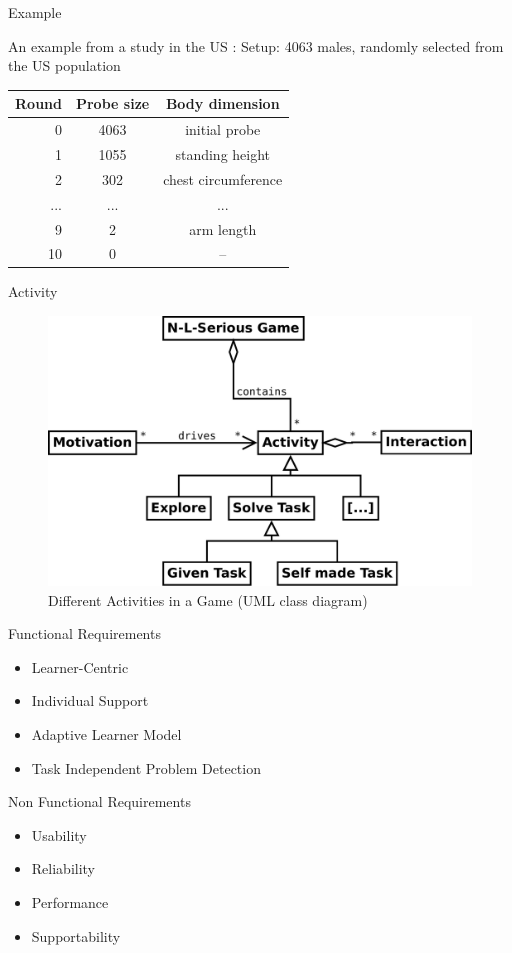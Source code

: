 \documentclass[compress]{beamer}
\begin{document}
\begin{frame}{Example}
\begin{block}{An example from a study in the US \cite{Bailey1982}:}
Setup: 4063 males, randomly selected from the US population\\
\vspace{5mm}
\pause
\begin{center}
\begin{tabular}{ r | c | c }
  Round & Probe size & Body dimension\\
  \hline
  0 & 4063 & initial probe \\
  1 & 1055 & standing height \\
  2 & 302 & chest circumference \\
  ... & ... & ... \\
  9 & 2 & arm length \\
 10 & 0 & -- \\
\end{tabular}
\end{center}
\end{block}
\end{frame}

\begin{frame}{Activity}
\begin{figure}
    \centering
    \includegraphics[height=0.6\textheight]{diagrams/activity_motivation.pdf}
    \caption{Different Activities in a Game (UML class diagram)}
\end{figure}
\end{frame}

\begin{frame}{Functional Requirements}
\begin{itemize}
\item Learner-Centric
\item Individual Support
\item Adaptive Learner Model
\item Task Independent Problem Detection
\end{itemize}
\end{frame}

\begin{frame}{Non Functional Requirements}
\begin{itemize}
\item Usability
\item Reliability
\item Performance
\item Supportability
\end{itemize}
\end{frame}
\end{document}
